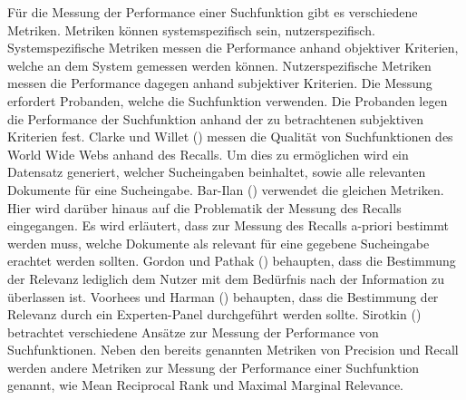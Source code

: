 
Für die Messung der Performance einer Suchfunktion gibt es verschiedene Metriken.
Metriken können systemspezifisch sein, nutzerspezifisch.
Systemspezifische Metriken messen die Performance anhand objektiver Kriterien, welche an dem System gemessen werden können.
Nutzerspezifische Metriken messen die Performance dagegen anhand subjektiver Kriterien.
Die Messung erfordert Probanden, welche die Suchfunktion verwenden.
Die Probanden legen die Performance der Suchfunktion anhand der zu betrachtenen subjektiven Kriterien fest.
Clarke und Willet (\citeyear{Clarke_Willett_1997}) messen die Qualität von Suchfunktionen des World Wide Webs anhand des Recalls.
Um dies zu ermöglichen wird ein Datensatz generiert, welcher Sucheingaben beinhaltet, sowie alle relevanten Dokumente für eine Sucheingabe.
Bar-Ilan (\citeyear{Bar-Ilan_2002}) verwendet die gleichen Metriken.
Hier wird darüber hinaus auf die Problematik der Messung des Recalls eingegangen.
Es wird erläutert, dass zur Messung des Recalls a-priori bestimmt werden muss, welche Dokumente als relevant für eine gegebene Sucheingabe erachtet werden sollten.
Gordon und Pathak (\citeyear{Gordon_Pathak_1999}) behaupten, dass die Bestimmung der Relevanz lediglich dem Nutzer mit dem Bedürfnis nach der Information zu überlassen ist.
Voorhees und Harman (\citeyear{Voorhees_Harman_2001}) behaupten, dass die Bestimmung der Relevanz durch ein Experten-Panel durchgeführt werden sollte.
Sirotkin (\citeyear{Sirotkin_2012}) betrachtet verschiedene Ansätze zur Messung der Performance von Suchfunktionen.
Neben den bereits genannten Metriken von Precision und Recall werden andere Metriken zur Messung der Performance einer Suchfunktion genannt, wie Mean Reciprocal Rank und Maximal Marginal Relevance.\\
